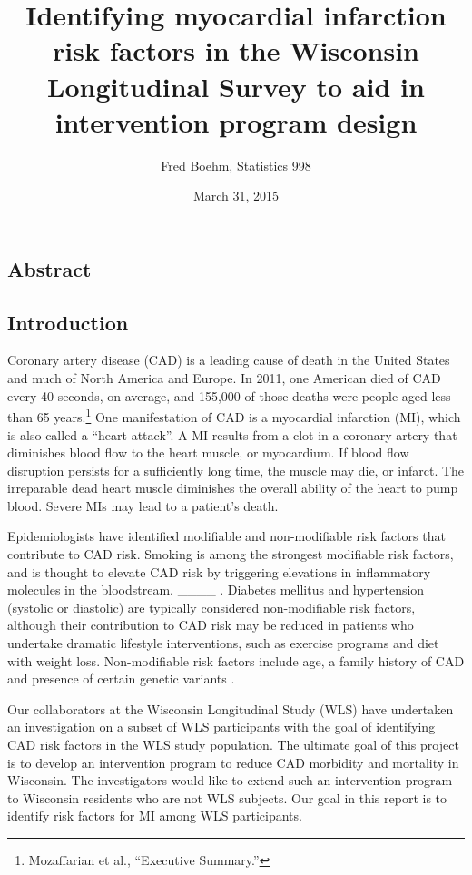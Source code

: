 \documentclass[11pt,]{article}
\title{Identifying myocardial infarction risk factors in the Wisconsin
Longitudinal Survey to aid in intervention program design}
\author{Fred Boehm, Statistics 998}
\date{March 31, 2015}
\let\rmarkdownfootnote\footnote%
\def\footnote{\protect\rmarkdownfootnote}
\begin{document}
\maketitle


\listoftodos

\subsection{Abstract}\label{abstract}

\subsection{Introduction}\label{introduction}

Coronary artery disease (CAD) is a leading cause of death in the United
States and much of North America and Europe. In 2011, one American died
of CAD every 40 seconds, on average, and 155,000 of those deaths were
people aged less than 65 years.\footnote{Mozaffarian et al., ``Executive
  Summary.'' } One manifestation of CAD is a myocardial infarction (MI),
which is also called a ``heart attack''. A MI results from a clot in a
coronary artery that diminishes blood flow to the heart muscle, or
myocardium. If blood flow disruption persists for a sufficiently long
time, the muscle may die, or infarct. The irreparable dead heart muscle
diminishes the overall ability of the heart to pump blood. Severe MIs
may lead to a patient's death.

Epidemiologists have identified modifiable and non-modifiable risk
factors that contribute to CAD risk. Smoking is among the strongest
modifiable risk factors, and is thought to elevate CAD risk by
triggering elevations in inflammatory molecules in the bloodstream.
\_\_\_\_
.
Diabetes mellitus and hypertension (systolic or diastolic) are typically
considered non-modifiable risk factors, although their contribution to
CAD risk may be reduced in patients who undertake dramatic lifestyle
interventions, such as exercise programs and diet with weight loss.
Non-modifiable risk factors include age, a family history of CAD and
presence of certain genetic variants
.

Our collaborators at the Wisconsin Longitudinal Study (WLS) have
undertaken an investigation on a subset of WLS participants with the
goal of identifying CAD risk factors in the WLS study population. The
ultimate goal of this project is to develop an intervention program to
reduce CAD morbidity and mortality in Wisconsin. The investigators would
like to extend such an intervention program to Wisconsin residents who
are not WLS subjects. Our goal in this report is to identify risk
factors for MI among WLS participants.
\end{document}
